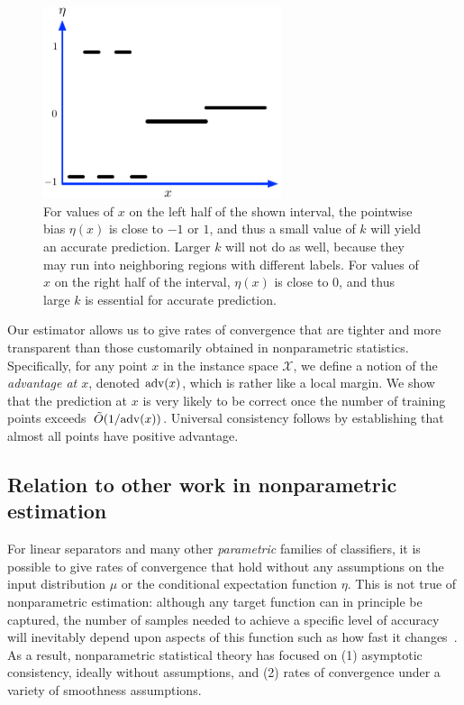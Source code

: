\documentclass{article}
\def\X{{\mathcal X}}
\def\adv{{\rm adv}}
\begin{document}
\begin{figure}
\begin{center}
\includegraphics[width=2.75in]{figs/adaptive-rationale.pdf}
\end{center}
\caption{For values of $x$ on the left half of the shown interval, the
  pointwise bias $\eta(x)$ is close to $-1$ or $1$, and thus a small value of $k$ will yield an accurate prediction. Larger $k$ will not do as well, because they may run into neighboring regions with different labels. For values of $x$ on the right half of the interval, $\eta(x)$ is close to $0$, and thus large $k$ is essential for accurate prediction.}
\label{fig:rationale}
\end{figure}

Our estimator allows us to give rates of convergence that are tighter and more 
transparent than those customarily obtained in nonparametric statistics. Specifically, for any point $x$ in the instance space $\X$, we define a notion of the {\it advantage at $x$}, denoted $\adv(x)$, which is rather like a local margin. We show that the prediction at $x$ is very likely to be correct once the number of training points exceeds~$\tilde{O}(1/\adv(x))$. Universal consistency follows by establishing that almost all points have positive advantage.

\subsection{Relation to other work in nonparametric estimation}

For linear separators and many other {\it parametric} families of classifiers, it is possible to give rates of convergence that hold without any assumptions on the input distribution $\mu$ or the conditional expectation function $\eta$. This is not true of nonparametric estimation: although any target function can in principle be captured, the number of samples needed to achieve a specific level of accuracy will inevitably depend upon aspects of this function such as how fast it changes~\cite[chapter 7]{DGL96}. As a result, nonparametric statistical theory has focused on (1) asymptotic consistency, ideally without assumptions, and (2) rates of convergence under a variety of smoothness assumptions.
\end{document}
